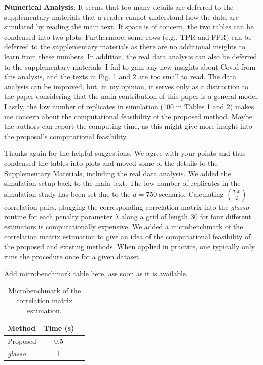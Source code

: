 \begin{point}
    \textbf{Numerical Analysis}: It seems that too many details are deferred to the supplementary materials that a reader cannot understand how the data are simulated by reading the main text. If space is of concern, the two tables can be condensed into two plots. Furthermore, some rows (e.g., TPR and FPR) can be deferred to the supplementary materials as there are no additional insights to learn from these numbers. In addition, the real data analysis can also be deferred to the supplementary materials. I fail to gain any new insights about Covid from this analysis, and the texts in Fig. 1 and 2 are too small to read. The data analysis can be improved, but, in my opinion, it serves only as a distraction to the paper considering that the main contribution of this paper is a general model. Lastly, the low number of replicates in simulation (100 in Tables 1 and 2) makes me concern about the computational feasibility of the proposed method. Maybe the authors can report the computing time, as this might give more insight into the proposal’s computational feasibility.
\end{point}

\begin{reply}
    Thanks again for the helpful suggestions. We agree with your points and thus condensed the tables into plots and moved some of the details to the Supplementary Materials, including the real data analysis. We added the simulation setup back to the main text. The low number of replicates in the simulation study has been set due to the \(d=750\) scenario. Calculating \({750\choose 2}\) correlation pairs, plugging the corresponding correlation matrix into the \textit{glasso} routine for each penalty parameter \(\lambda\) along a grid of length 30 for four different estimators is computationally expensive. We added a microbenchmark of the correlation matrix estimation to give an idea of the computational feasibility of the proposed and existing methods. When applied in practice, one typically only runs the procedure once for a given dataset.
\end{reply}

\begin{change}
    Add microbenchmark table here, ass soon as it is available.

    \begin{table}
        \centering
        \caption{Microbenchmark of the correlation matrix estimation.}
        \begin{tabular}{lcc}
            \toprule
            Method          & Time (s) \\
            \midrule
            Proposed        & 0.5      \\
            \textit{glasso} & 1        \\
        \end{tabular}
    \end{table}

\end{change}